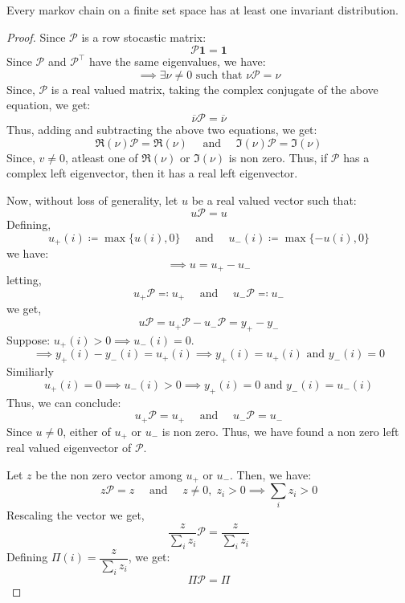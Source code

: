 \begin{theorem}
    Every markov chain on a finite set space has at least one invariant distribution.
\end{theorem}
\begin{proof}
    Since \(\mathcal{P} \) is a row stocastic matrix:
    \[
        \mathcal{P} \mathbf{1} = \mathbf{1}  
    \]
    Since \(\mathcal{P} \) and \(\mathcal{P} ^{\top} \) have the same eigenvalues, we have:
    \[
        \implies \exists \nu  \neq 0 \text{ such that }  \nu \mathcal{P} = \nu
    \]
    Since, \(\mathcal{P}\) is a real valued matrix, taking the complex conjugate of the above equation, we get:
    \[
        \overline{\nu} \mathcal{P} = \overline{\nu}
    \]
    Thus, adding and subtracting the above two equations, we get:
    \[
        \Re (\nu) \mathcal{P} = \Re (\nu) \quad \text{ and } \quad  \Im (\nu) \mathcal{P} = \Im (\nu)
    \]
    Since, \(v \neq  0\), atleast one of \(\Re (\nu) \) or \(\Im (\nu) \) is non zero.
    Thus, if \(\mathcal{P} \) has a complex left eigenvector, then it has a real left eigenvector.

    Now, without loss of generality, let \(u\) be a real valued vector such that:
    \[
        u \mathcal{P} = u
    \]
    Defining,
    \[
        u_+(i) \coloneqq  \max \{u(i), 0\} \quad \text{ and } \quad u_-(i) \coloneqq  \max \{-u(i), 0\}
    \]
    we have:
    \[
        \implies u = u_+ - u_-
    \]
    letting,
    \[
        u_+ \mathcal{P} \eqqcolon u_+ \quad \text{ and } \quad u_- \mathcal{P} \eqqcolon  u_-
    \]
    we get,
    \[
        u \mathcal{P} = u_+ \mathcal{P} - u_- \mathcal{P} = y_+ - y_-  
    \]
    Suppose: \( u_+(i) > 0  \implies  u_-(i) = 0\).
    \[
        \implies y_+(i) - y_-(i) = u_+(i) \implies y_+(i) = u_+(i) \text{ and } y_-(i) = 0 
    \]
    Similiarly
    \[
        u_+(i) = 0 \implies u_-(i) > 0 \implies y_+(i) = 0 \text{ and } y_-(i) = u_-(i)
    \]
    Thus, we can conclude:
    \[
        u_+ \mathcal{P} = u_+ \quad \text{ and } \quad u_- \mathcal{P} = u_-
    \]
    Since \(u \neq  0\), either of \(u_+\) or \(u_-\) is non zero. 
    Thus, we have found a non zero left real valued eigenvector of \(\mathcal{P}\).

    Let \(z\) be the non zero vector among  \(u_+\) or \(u_-\). Then, we have:
    \[
        z \mathcal{P} = z \quad \text{ and } \quad z \neq 0, \; z_i > 0 \implies \sum_{i} z_i > 0 
    \]
    Rescaling the vector we get,
    \[
        \frac{z}{\sum_i z_i} \mathcal{P} = \frac{z}{\sum_i z_i}
    \]
    Defining \(\Pi(i) = \dfrac{z}{\sum_i z_i}\), we get:
    \[
        \Pi \mathcal{P} = \Pi
    \]    
\end{proof}

